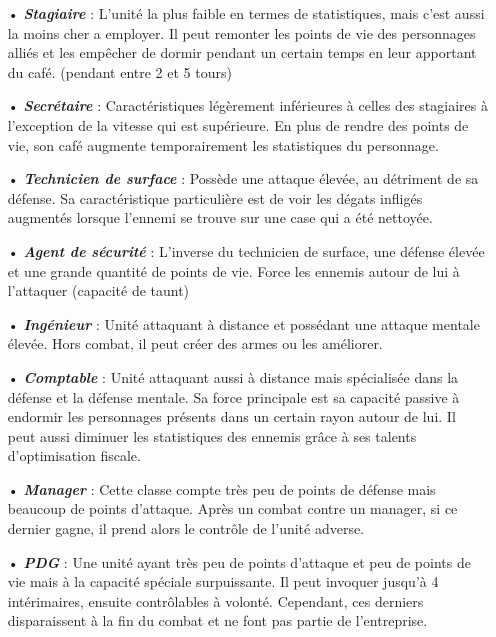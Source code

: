 \documentclass{article}
\begin{document}
\begin{itemize}
\item[•] \textbf{\textit{Stagiaire}} : L'unité la plus faible en termes de statistiques, mais c'est aussi la moins cher a employer. Il peut remonter les points de vie des personnages alliés et les empêcher de dormir pendant un certain temps en leur apportant du café. (pendant entre 2 et 5 tours)\\
\item[•] \textbf{\textit{Secrétaire}} : Caractéristiques légèrement inférieures à celles des stagiaires à l'exception de la vitesse qui est supérieure. En plus de rendre des points de vie, son café augmente temporairement les statistiques du personnage.\\
\item[•] \textbf{\textit{Technicien de surface}} : Possède une attaque élevée, au détriment de sa défense. Sa caractéristique particulière est de voir les dégats infligés augmentés lorsque l'ennemi se trouve sur une case qui a été nettoyée.\\
\item[•] \textbf{\textit{Agent de sécurité}} : L'inverse du technicien de surface, une défense élevée et une grande quantité de points de vie. Force les ennemis autour de lui à l'attaquer (capacité de taunt)\\

\item[•] \textbf{\textit{Ingénieur}} : Unité attaquant à distance et possédant une attaque mentale élevée. Hors combat, il peut créer des armes ou les améliorer.\\
\item[•] \textbf{\textit{Comptable}} : Unité attaquant aussi à distance mais spécialisée dans la défense et la défense mentale. Sa force principale est sa capacité passive à endormir les personnages présents dans un certain rayon autour de lui. Il peut aussi diminuer les statistiques des ennemis grâce à ses talents d'optimisation fiscale.\\
\item[•] \textbf{\textit{Manager}} : Cette classe compte très peu de points de défense mais beaucoup de points d'attaque. Après un combat contre un manager, si ce dernier gagne, il prend alors le contrôle de l'unité adverse.\\
\item[•] \textbf{\textit{PDG}} : Une unité ayant très peu de points d'attaque et peu de points de vie mais à la capacité spéciale surpuissante. Il peut invoquer jusqu'à 4 intérimaires, ensuite contrôlables à volonté. Cependant, ces derniers disparaissent à la fin du combat et ne font pas partie de l'entreprise.\\
\end{itemize}
\end{document}
